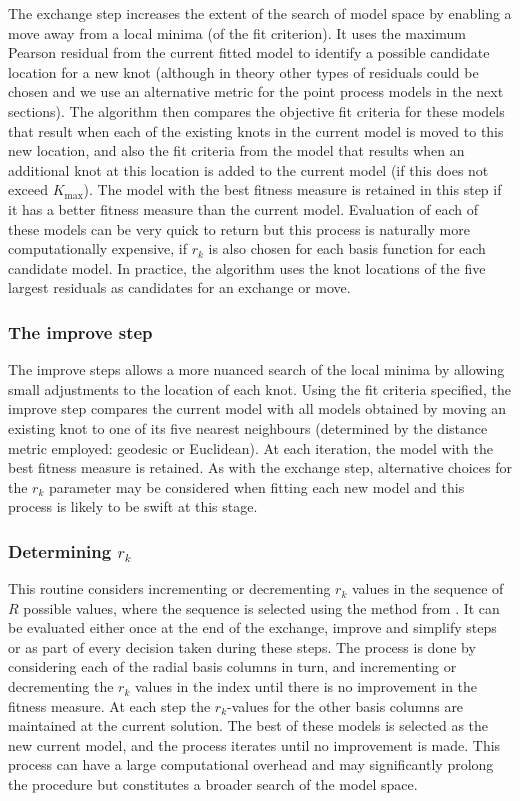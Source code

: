 \documentclass[letterpaper, 12pt]{interact}
\begin{document}
	The exchange step increases the extent of the search of model space by enabling a move away from a local minima (of the fit criterion). It uses the maximum Pearson residual from the current fitted model to identify a possible candidate location for a new knot (although in theory other types of residuals could be chosen and we use an alternative metric for the point process models in the next sections). The algorithm then compares the objective fit criteria for these models that result when each of the existing knots in the current model is moved to this new location, and also the fit criteria from the model that results when an additional knot at this location is added to the current model (if this does not exceed \(K_{\textrm{max}}\)). The model with the best fitness measure is retained in this step if it has a better fitness measure than the current model. Evaluation of each of these models can be very quick to return but this process is naturally more computationally expensive, if \(r_k\) is also chosen for each basis function for each candidate model. In practice, the algorithm uses the knot locations of the five largest residuals as candidates for an exchange or move.
	
	
	\subsubsection*{The improve step}\label{the-improve-step}
	
	The improve steps allows a more nuanced search of the local minima by allowing small adjustments to the location of each knot. Using the fit criteria specified, the improve step compares the current model with all models obtained by moving an existing knot to one of its five nearest neighbours (determined by the distance metric employed: geodesic or Euclidean). At each iteration, the model with the best fitness measure is retained. As with the exchange step, alternative choices for the \(r_k\) parameter may be considered when fitting each new model and this process is likely to be swift at this stage.
	
	
	\subsubsection*{Determining $r_k$}
	\label{determining-r_k}
	
	This routine considers incrementing or decrementing \(r_k\) values in the sequence of \(R\) possible values, where the sequence is selected using the method from \citealp{scott2014}. It can be evaluated either once at the end of the exchange, improve and simplify steps or as part of every decision taken during these steps. The process is done by considering each of the radial basis columns in turn, and incrementing or decrementing the \(r_k\) values in the index until there is no improvement in the fitness measure. At each step the \(r_k\)-values for the other basis columns are maintained at the current solution. The best of these models is selected as the new current model, and the process iterates until no improvement is made. This process can have a large computational overhead and may significantly prolong the procedure but constitutes a broader search of the model space. 
	
\end{document}

